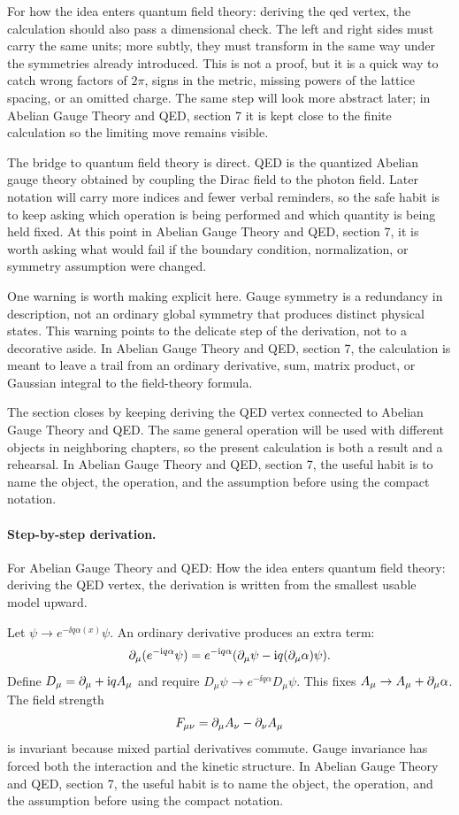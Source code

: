 For how the idea enters quantum field theory: deriving the qed vertex, the calculation should also pass a dimensional check.  The left and right sides must carry the same units; more subtly, they must transform in the same way under the symmetries already introduced.  This is not a proof, but it is a quick way to catch wrong factors of \(2\pi\), signs in the metric, missing powers of the lattice spacing, or an omitted charge.  The same step will look more abstract later; in Abelian Gauge Theory and QED, section 7 it is kept close to the finite calculation so the limiting move remains visible.

The bridge to quantum field theory is direct.  QED is the quantized Abelian gauge theory obtained by coupling the Dirac field to the photon field.  Later notation will carry more indices and fewer verbal reminders, so the safe habit is to keep asking which operation is being performed and which quantity is being held fixed.  At this point in Abelian Gauge Theory and QED, section 7, it is worth asking what would fail if the boundary condition, normalization, or symmetry assumption were changed.

One warning is worth making explicit here.  Gauge symmetry is a redundancy in description, not an ordinary global symmetry that produces distinct physical states.  This warning points to the delicate step of the derivation, not to a decorative aside.  In Abelian Gauge Theory and QED, section 7, the calculation is meant to leave a trail from an ordinary derivative, sum, matrix product, or Gaussian integral to the field-theory formula.

The section closes by keeping deriving the QED vertex connected to Abelian Gauge Theory and QED.  The same general operation will be used with different objects in neighboring chapters, so the present calculation is both a result and a rehearsal.  In Abelian Gauge Theory and QED, section 7, the useful habit is to name the object, the operation, and the assumption before using the compact notation.



\paragraph{Step-by-step derivation.}

For Abelian Gauge Theory and QED: How the idea enters quantum field theory: deriving the QED vertex, the derivation is written from the smallest usable model upward.

Let \(\psi\to e^{-\ii q\alpha(x)}\psi\).  An ordinary derivative produces an extra term:
\[
  \partial_\mu(e^{-\mathrm i q\alpha}\psi)
  =
  e^{-\mathrm i q\alpha}(\partial_\mu\psi-\mathrm i q(\partial_\mu\alpha)\psi).
\]
Define \(D_\mu=\partial_\mu+\mathrm i qA_\mu\) and require \(D_\mu\psi\to e^{-\ii q\alpha}D_\mu\psi\).  This fixes \(A_\mu\to A_\mu+\partial_\mu\alpha\).  The field strength
\[
  F_{\mu\nu}=\partial_\mu A_\nu-\partial_\nu A_\mu
\]
is invariant because mixed partial derivatives commute.  Gauge invariance has forced both the interaction and the kinetic structure.  In Abelian Gauge Theory and QED, section 7, the useful habit is to name the object, the operation, and the assumption before using the compact notation.

